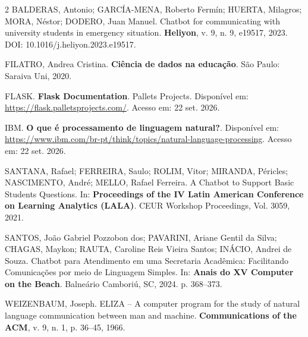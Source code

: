 \documentclass[10pt]{article}
\begin{document}
\begin{multicols}{2}
BALDERAS, Antonio; GARCÍA-MENA, Roberto Fermín; HUERTA, Milagros; MORA,
Néstor; DODERO, Juan Manuel. Chatbot for communicating with university
students in emergency situation. \textbf{Heliyon}, v. 9, n. 9, e19517,
2023. DOI: 10.1016/j.heliyon.2023.e19517.

FILATRO, Andrea Cristina. \textbf{Ciência de dados na educação}. São
Paulo: Saraiva Uni, 2020.

FLASK. \textbf{Flask Documentation}. Pallets Projects. Disponível em:
\url{https://flask.palletsprojects.com/}. Acesso em: 22 set. 2026.

IBM. \textbf{O que é processamento de linguagem natural?}. Disponível em:
\url{https://www.ibm.com/br-pt/think/topics/natural-language-processing}.
Acesso em: 22 set. 2026.

SANTANA, Rafael; FERREIRA, Saulo; ROLIM, Vitor; MIRANDA, Péricles;
NASCIMENTO, André; MELLO, Rafael Ferreira. A Chatbot to Support Basic
Students Questions. In: \textbf{Proceedings of the IV Latin American
Conference on Learning Analytics (LALA)}. CEUR Workshop Proceedings, Vol.
3059, 2021.

SANTOS, João Gabriel Pozzobon dos; PAVARINI, Ariane Gentil da Silva;
CHAGAS, Maykon; RAUTA, Caroline Reis Vieira Santos; INÁCIO, Andrei de
Souza. Chatbot para Atendimento em uma Secretaria Acadêmica: Facilitando
Comunicações por meio de Linguagem Simples. In: \textbf{Anais do XV
Computer on the Beach}. Balneário Camboriú, SC, 2024. p. 368--373.

WEIZENBAUM, Joseph. ELIZA -- A computer program for the study of natural
language communication between man and machine. \textbf{Communications of
the ACM}, v. 9, n. 1, p. 36--45, 1966.

\end{multicols}
\end{document}
